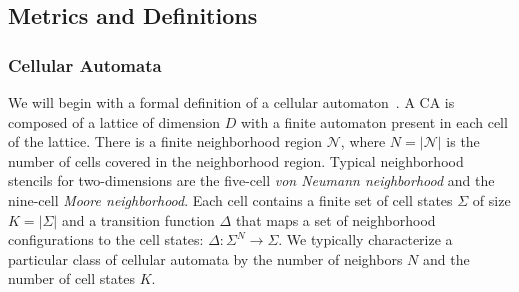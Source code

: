 \documentclass[a4paper,11pt]{article}
\begin{document}

\subsection{Metrics and Definitions}
\label{subsec:metrics}
\subsubsection*{Cellular Automata}
We will begin with a formal definition of a cellular automaton~\cite{la90}. A CA is composed of a lattice of dimension $D$ with a finite automaton present in each cell of the lattice. There is a finite neighborhood region $\mathcal{N}$, where $N = |\mathcal{N}|$ is the number of cells covered in the neighborhood region. Typical neighborhood stencils for two-dimensions are the five-cell \textit{von Neumann neighborhood} and the nine-cell \textit{Moore neighborhood}. %
Each cell contains a finite set of cell states $\Sigma$ of size $K = |\Sigma|$ and a transition function $\Delta$ that maps a set of neighborhood configurations to the cell states: $\Delta: \Sigma^N \to \Sigma$. We typically characterize a particular class of cellular automata by the number of neighbors $N$ and the number of cell states $K$.
\end{document}
